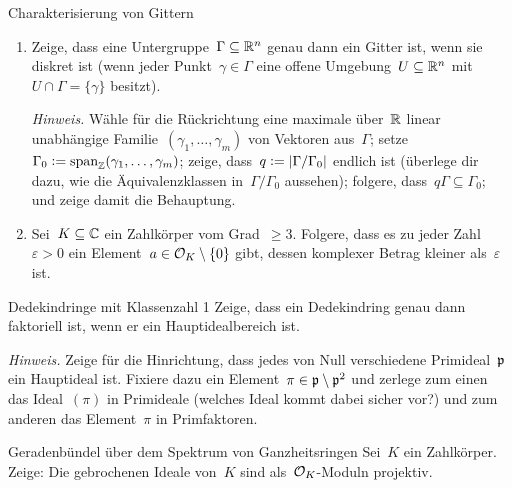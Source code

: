 \documentclass{uebblatt}
\begin{document}
\begin{aufgabe}{Charakterisierung von Gittern}
\begin{enumerate}
\item Zeige, dass eine Untergruppe~$\Gamma \subseteq \mathbb{R}^n$ genau dann ein Gitter
ist, wenn sie diskret ist (wenn jeder Punkt~$\gamma \in \Gamma$ eine
offene Umgebung~$U \subseteq \mathbb{R}^n$ mit~$U \cap \Gamma =
\{\gamma\}$ besitzt).

{\tiny\emph{Hinweis.} Wähle für die Rückrichtung eine maximale
über~$\mathbb{R}$ linear unabhängige Familie~$(\gamma_1,\ldots,\gamma_m)$ von Vektoren
aus~$\Gamma$; setze~$\Gamma_0 \vcentcolon=
\operatorname{span}_{\mathbb{Z}}(\gamma_1,\ldots,\gamma_m)$; zeige, dass~$q \vcentcolon=
|\Gamma/\Gamma_0|$ endlich ist (überlege dir dazu, wie die Äquivalenzklassen
in~$\Gamma/\Gamma_0$ aussehen); folgere, dass~$q\Gamma \subseteq \Gamma_0$; und
zeige damit die Behauptung.\par}
\item Sei~$K \subseteq \mathbb{C}$ ein Zahlkörper vom Grad~$\geq 3$. Folgere, dass es zu
jeder Zahl~$\varepsilon > 0$ ein Element~$a \in \mathcal{O}_K \setminus \{0\}$ gibt,
dessen komplexer Betrag kleiner als~$\varepsilon$ ist.
\end{enumerate}
\end{aufgabe}

\begin{aufgabe*}{Dedekindringe mit Klassenzahl 1}
Zeige, dass ein Dedekindring genau dann faktoriell ist, wenn er ein
Hauptidealbereich ist.

{\tiny\emph{Hinweis.} Zeige für die Hinrichtung, dass jedes von Null
verschiedene Primideal~$\mathfrak{p}$ ein Hauptideal ist. Fixiere dazu ein Element~$\pi
\in \mathfrak{p} \setminus \mathfrak{p}^2$ und zerlege zum einen das Ideal~$(\pi)$ in Primideale (welches
Ideal kommt dabei sicher vor?) und zum anderen das Element~$\pi$ in
Primfaktoren.\par}
\end{aufgabe*}

\begin{aufgabe*}{Geradenbündel über dem Spektrum von Ganzheitsringen}
Sei~$K$ ein Zahlkörper. Zeige: Die gebrochenen Ideale von~$K$ sind
als~$\mathcal{O}_K$-Moduln projektiv.
\end{aufgabe*}
\end{document}
